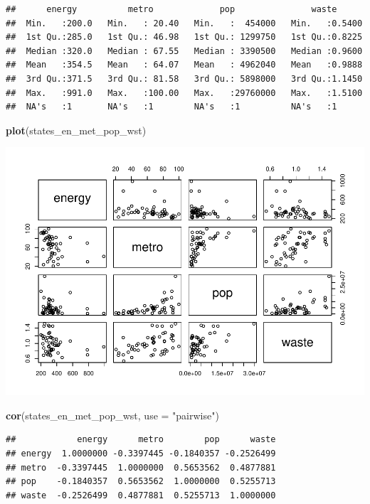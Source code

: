 \documentclass[]{book}
\newenvironment{Shaded}{\begin{snugshade}}{\end{snugshade}}
\newcommand{\DataTypeTok}[1]{\textcolor[rgb]{0.13,0.29,0.53}{#1}}
\newcommand{\KeywordTok}[1]{\textcolor[rgb]{0.13,0.29,0.53}{\textbf{#1}}}
\newcommand{\NormalTok}[1]{#1}
\newcommand{\StringTok}[1]{\textcolor[rgb]{0.31,0.60,0.02}{#1}}
\begin{document}
\begin{verbatim}
##      energy          metro             pop               waste       
##  Min.   :200.0   Min.   : 20.40   Min.   :  454000   Min.   :0.5400  
##  1st Qu.:285.0   1st Qu.: 46.98   1st Qu.: 1299750   1st Qu.:0.8225  
##  Median :320.0   Median : 67.55   Median : 3390500   Median :0.9600  
##  Mean   :354.5   Mean   : 64.07   Mean   : 4962040   Mean   :0.9888  
##  3rd Qu.:371.5   3rd Qu.: 81.58   3rd Qu.: 5898000   3rd Qu.:1.1450  
##  Max.   :991.0   Max.   :100.00   Max.   :29760000   Max.   :1.5100  
##  NA's   :1       NA's   :1        NA's   :1          NA's   :1
\end{verbatim}

\begin{Shaded}
\begin{Highlighting}[]
  \KeywordTok{plot}\NormalTok{(states_en_met_pop_wst)}
\end{Highlighting}
\end{Shaded}

\includegraphics{R/Rmodels/figures/unnamed-chunk-103-1.pdf}

\begin{Shaded}
\begin{Highlighting}[]
  \KeywordTok{cor}\NormalTok{(states_en_met_pop_wst, }\DataTypeTok{use =} \StringTok{"pairwise"}\NormalTok{)}
\end{Highlighting}
\end{Shaded}

\begin{verbatim}
##            energy      metro        pop      waste
## energy  1.0000000 -0.3397445 -0.1840357 -0.2526499
## metro  -0.3397445  1.0000000  0.5653562  0.4877881
## pop    -0.1840357  0.5653562  1.0000000  0.5255713
## waste  -0.2526499  0.4877881  0.5255713  1.0000000
\end{verbatim}
\end{document}
